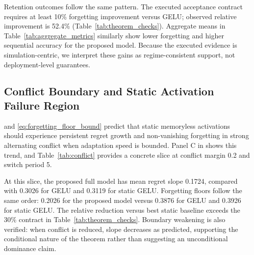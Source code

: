 \documentclass{article} %
\begin{document}
Retention outcomes follow the same pattern. The executed acceptance contract requires at least 10\% forgetting improvement versus GELU; observed relative improvement is 52.4\% (Table~\ref{tab:theorem_checks}). Aggregate means in Table~\ref{tab:aggregate_metrics} similarly show lower forgetting and higher sequential accuracy for the proposed model. Because the executed evidence is simulation-centric, we interpret these gains as regime-consistent support, not deployment-level guarantees.

\subsection{Conflict Boundary and Static Activation Failure Region}
 and \eqref{eq:forgetting_floor_bound} predict that static memoryless activations should experience persistent regret growth and non-vanishing forgetting in strong alternating conflict when adaptation speed is bounded. Panel C in  shows this trend, and Table~\ref{tab:conflict} provides a concrete slice at conflict margin 0.2 and switch period 5.

At this slice, the proposed full model has mean regret slope 0.1724, compared with 0.3026 for GELU and 0.3119 for static GELU. Forgetting floors follow the same order: 0.2026 for the proposed model versus 0.3876 for GELU and 0.3926 for static GELU. The relative reduction versus best static baseline exceeds the 30\% contract in Table~\ref{tab:theorem_checks}. Boundary weakening is also verified: when conflict is reduced, slope decreases as predicted, supporting the conditional nature of the theorem rather than suggesting an unconditional dominance claim.
\end{document}
